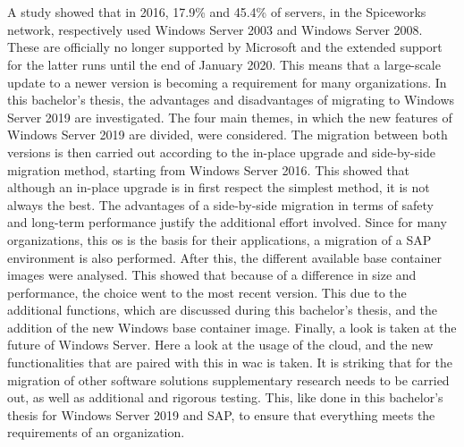 \chapter*{}
A study showed that in 2016, 17.9\% and 45.4\% of servers, in the Spiceworks network, respectively used Windows Server 2003 and Windows Server 2008. \autocite{Tsai2016} 
These are officially no longer supported by Microsoft and the extended support for the latter runs until the end of January 2020. 
This means that a large-scale update to a newer version is becoming a requirement for many organizations. 
In this bachelor's thesis, the advantages and disadvantages of migrating to Windows Server 2019 are investigated. 
The four main themes, in which the new features of Windows Server 2019 are divided, were considered. 
The migration between both versions is then carried out according to the in-place upgrade and side-by-side migration method, starting from Windows Server 2016. 
This showed that although an in-place upgrade is in first respect the simplest method, it is not always the best. 
The advantages of a side-by-side migration in terms of safety and long-term performance justify the additional effort involved.
Since for many organizations, this \acrshort{os} is the basis for their applications, a migration of a SAP environment is also performed. 
After this, the different available base container images were analysed. 
This showed that because of a difference in size and performance, the choice went to the most recent version. 
This due to the additional functions, which are discussed during this bachelor's thesis, and the addition of the new Windows base container image.
Finally, a look is taken at the future of Windows Server. 
Here a look at the usage of the cloud, and the new functionalities that are paired with this in \acrlong{wac} is taken. 
It is striking that for the migration of other software solutions supplementary research needs to be carried out, as well as additional and rigorous testing. 
This, like done in this bachelor's thesis for Windows Server 2019 and SAP, to ensure that everything meets the requirements of an organization.